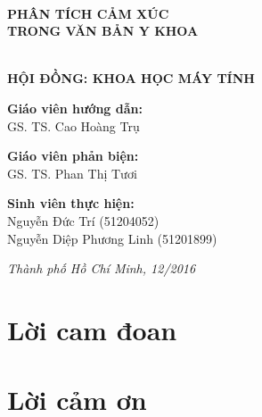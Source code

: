 \documentclass[a4paper, 12pt]{article}
\theoremstyle{definition}
\begin{document}
\begin{titlepage}
\HRule \\[0.4cm]
{ \huge \bfseries PHÂN TÍCH CẢM XÚC\\TRONG VĂN BẢN Y KHOA}\\[0.2cm] %
\HRule \\[0.8cm]

\begin{flushright}
\begin{minipage}{0.7\textwidth}

\end{minipage}
\end{flushright}

\begin{flushleft} \large
\textbf{HỘI ĐỒNG: KHOA HỌC MÁY TÍNH}\\[1.0cm]
\end{flushleft}

\begin{flushleft} \large
\textbf{Giáo viên hướng dẫn:}\\
GS. TS. Cao Hoàng Trụ\\[1.0cm]
\end{flushleft}

\begin{flushleft} \large
\textbf{Giáo viên phản biện:}\\
GS. TS. Phan Thị Tươi\\[1.0cm]
\end{flushleft}

\begin{flushleft} \large
\textbf{Sinh viên thực hiện:}\\
Nguyễn Đức Trí (51204052)\\
Nguyễn Diệp Phương Linh (51201899)\\[1.5cm]
\end{flushleft}

\large \emph{Thành phố Hồ Chí Minh, 12/2016}

\vfill %
\end{titlepage}

\pagebreak
\section*{Lời cam đoan}
\pagebreak
\section*{Lời cảm ơn}
\pagebreak
\end{document}
